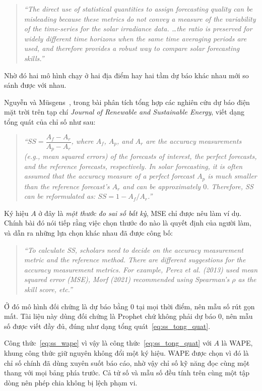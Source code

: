 \begin{quote}\small
\textit{``The direct use of statistical quantities to assign forecasting quality can be
misleading because these metrics do not convey a measure of the variability of the time-series
for the solar irradiance data. \dots the ratio is preserved for widely different time horizons
when the same time averaging periods are used, and therefore provides a robust way to compare
solar forecasting skills.''}
\end{quote}

Nhờ đó hai mô hình chạy ở hai địa điểm hay hai tầm dự báo khác nhau mới so sánh được với nhau.

Nguyễn và Müsgens~\cite{nguyen2026meta}, trong bài phân tích tổng hợp các nghiên cứu dự báo điện
mặt trời trên tạp chí \textit{Journal of Renewable and Sustainable Energy}, viết dạng tổng quát
của chỉ số như sau:

\begin{quote}\small
\textit{``$SS = \dfrac{A_f - A_r}{A_p - A_r}$, where $A_f$, $A_p$, and $A_r$ are the accuracy
measurements (e.g., mean squared errors) of the forecasts of interest, the perfect forecasts, and
the reference forecasts, respectively. In solar forecasting, it is often assumed that the accuracy
measure of a perfect forecast $A_p$ is much smaller than the reference forecast's $A_r$ and can be
approximately $0$. Therefore, SS can be reformulated as: $SS = 1 - A_f/A_r$.''}
\end{quote}

Ký hiệu $A$ ở đây là \textit{một thước đo sai số bất kỳ}, MSE chỉ được nêu làm ví dụ. Chính bài
đó nói tiếp rằng việc chọn thước đo nào là quyết định của người làm, và dẫn ra những lựa chọn
khác nhau đã được công bố:

\begin{quote}\small
\textit{``To calculate SS, scholars need to decide on the accuracy measurement metric and the
reference method. There are different suggestions for the accuracy measurement metrics. For
example, Perez et al. (2013) used mean squared error (MSE), Morf (2021) recommended using
Spearman's $\rho$ as the skill score, etc.''}
\end{quote}


Ở đó mô hình đối chứng là dự báo bằng $0$ tại mọi thời điểm, nên mẫu số rút gọn mất. Tài liệu này
dùng đối chứng là Prophet chứ không phải dự báo $0$, nên mẫu số được viết đầy đủ, đúng như dạng
tổng quát~\eqref{eq:ss_tong_quat}.

Công thức~\eqref{eq:ss_wape} vì vậy là công thức~\eqref{eq:ss_tong_quat} với $A$ là WAPE, khung
công thức giữ nguyên không đổi một ký hiệu. WAPE được chọn vì đó là chỉ số chính đã dùng xuyên
suốt báo cáo, nhờ vậy chỉ số kỹ năng đọc cùng một thang với mọi bảng phía trước. Cả tử số và mẫu
số đều tính trên cùng một tập dòng nên phép chia không bị lệch phạm vi.

